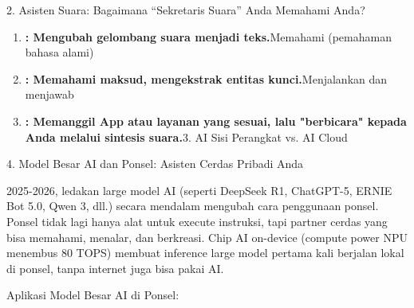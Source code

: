 


2. Asisten Suara: Bagaimana “Sekretaris Suara” Anda Memahami Anda?


\begin{enumerate}
  \item \textbf{: Mengubah gelombang suara menjadi teks.}Memahami (pemahaman bahasa alami)
  \item \textbf{: Memahami maksud, mengekstrak entitas kunci.}Menjalankan dan menjawab
  \item \textbf{: Memanggil App atau layanan yang sesuai, lalu "berbicara" kepada Anda melalui sintesis suara.}3. AI Sisi Perangkat vs. AI Cloud
\end{enumerate}


4. Model Besar AI dan Ponsel: Asisten Cerdas Pribadi Anda


2025-2026, ledakan large model AI (seperti DeepSeek R1, ChatGPT-5, ERNIE Bot 5.0, Qwen 3, dll.) secara mendalam mengubah cara penggunaan ponsel. Ponsel tidak lagi hanya alat untuk execute instruksi, tapi partner cerdas yang bisa memahami, menalar, dan berkreasi. Chip AI on-device (compute power NPU menembus 80 TOPS) membuat inference large model pertama kali berjalan lokal di ponsel, tanpa internet juga bisa pakai AI.


Aplikasi Model Besar AI di Ponsel:


